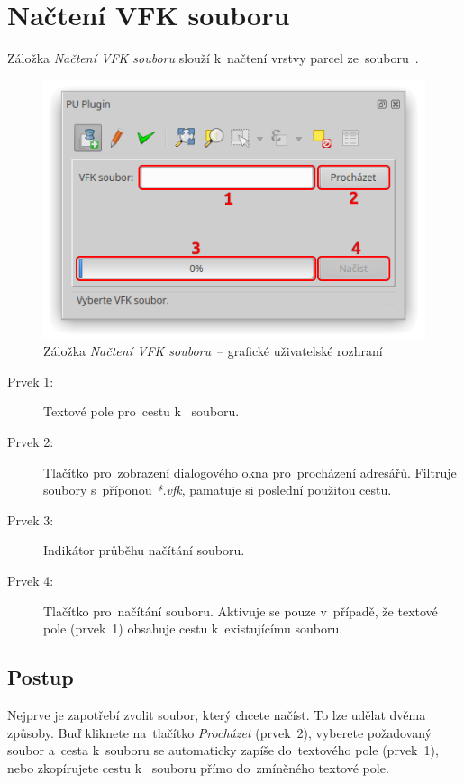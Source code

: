 \newpage

\section{Načtení VFK souboru}
\label{manual_nacteni_vfk}

Záložka \textit{Načtení VFK souboru} slouží k~načtení vrstvy parcel ze~souboru~.

	\begin{figure}[H]
		\centering
		\includegraphics[width=.55\textwidth]{./pictures/nacteni_vfk_gui.png}
		\caption[Záložka \textit{Načtení VFK souboru}~– grafické uživatelské rozhraní]{Záložka \textit{Načtení VFK souboru}~– grafické uživatelské rozhraní}
		\label{fig:manual_nacteni_vfk_gui}
 	\end{figure}

\begin{description}
	\item[Prvek 1:] Textové pole pro~cestu k~ souboru.
	\item[Prvek 2:] Tlačítko pro~zobrazení dialogového okna pro~procházení adresářů. Filtruje soubory s~příponou \textit{*.vfk}, pamatuje si poslední použitou cestu.
	\item[Prvek 3:] Indikátor průběhu načítání  souboru.
	\item[Prvek 4:] Tlačítko pro~načítání  souboru. Aktivuje se pouze v~případě, že textové pole (prvek~1) obsahuje cestu k~existujícímu  souboru.
\end{description}

\subsection{Postup}
\label{manual_nacteni_postup}

Nejprve je zapotřebí zvolit  soubor, který chcete načíst. To lze udělat dvěma způsoby. Buď kliknete na~tlačítko \textit{Procházet} (prvek~2), vyberete požadovaný soubor a~cesta k~souboru se automaticky zapíše do~textového pole (prvek~1), nebo zkopírujete cestu k~ souboru přímo do~zmíněného textové pole.

